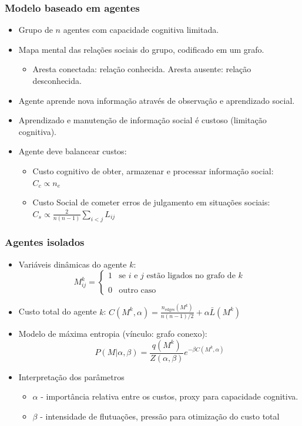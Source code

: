 \documentclass[ignorenonframetext,]{beamer}
\begin{document}
\begin{frame}\frametitle{Modelo baseado em agentes}

\begin{itemize}
\itemsep1pt\parskip0pt
\item
  Grupo de $n$ agentes com capacidade cognitiva limitada.
\item
  Mapa mental das relações sociais do grupo, codificado em um grafo.

  \begin{itemize}
  \itemsep1pt\parskip0pt
  \item
    Aresta conectada: relação conhecida. Aresta ausente: relação
    desconhecida.
  \end{itemize}
\item
  Agente aprende nova informação através de observação e aprendizado
  social.
\item
  Aprendizado e manutenção de informação social é custoso (limitação
  cognitiva).
\item
  Agente deve balancear custos:

  \begin{itemize}
  \itemsep1pt\parskip0pt
  \item
    Custo cognitivo de obter, armazenar e processar informação social:
    $C_{c} \propto n_{e}$
  \item
    Custo Social de cometer erros de julgamento em situações sociais:
    $C_{s} \propto \frac{2}{n(n-1)}\sum_{i<j}L_{ij}$
  \end{itemize}
\end{itemize}

\end{frame}

\begin{frame}\frametitle{Agentes isolados}

\begin{itemize}
\item
  Variáveis dinâmicas do agente $k$:
  \[M^{k}_{ij} = \begin{cases} 1  & \text{se $i$ e $j$ estão ligados no grafo de $k$} \\\\  0  & \text{outro caso}   \end{cases}\]
\item
  Custo total do agente $k$:
  $C(M^k, \alpha) = \frac{n_{\text{edges}}(M^k)}{n(n-1)/2} + \alpha \bar{L}(M^k)$
\item
  Modelo de máxima entropia (vínculo: grafo conexo):
  \[P(M \vert  \alpha, \beta) = \frac{q(M^k)}{Z(\alpha, \beta)} e^{-\beta C(M^k, \alpha)}\]
\item
  Interpretação dos parâmetros

  \begin{itemize}
  \item
    $\alpha$ - importância relativa entre os custos, proxy para
    capacidade cognitiva.
  \item
    $\beta$ - intensidade de flutuações, pressão para otimização do
    custo total
  \end{itemize}
\end{itemize}

\end{frame}
\end{document}
